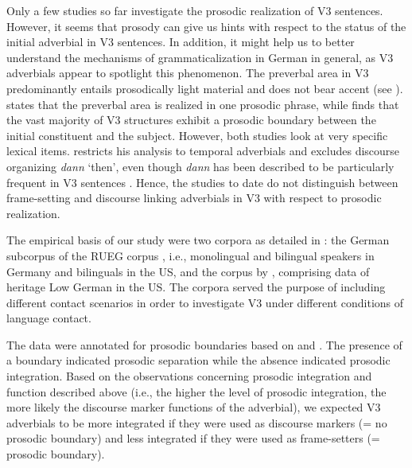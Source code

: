 \documentclass[output=paper,colorlinks,citecolor=brown]{langscibook}
\begin{document}
Only a few studies so far investigate the prosodic realization of V3 sentences. However, it seems that prosody can give us hints with respect to the status of the initial adverbial in V3 sentences. In addition, it might help us to better understand the mechanisms of grammaticalization in German in general, as V3 adverbials appear to spotlight this phenomenon. The preverbal area in V3 predominantly entails prosodically light material and does not bear accent (see \cite{Freywald_etal_2015, teVelde_2017}).  states that the preverbal area is realized in one prosodic phrase, while \citet{Breitbarth_2022} finds that the vast majority of V3 structures exhibit a prosodic boundary between the initial constituent and the subject. However, both studies look at very specific lexical items.  restricts his analysis to temporal adverbials and \citet{Breitbarth_2022} excludes discourse organizing \textit{dann} ‘then’, even though \textit{dann} has been described to be particularly frequent in V3 sentences \citep{Wiese_Müller_2018}. Hence, the studies to date do not distinguish between frame-setting and discourse linking adverbials in V3 with respect to prosodic realization.

The empirical basis of our study were two corpora as detailed in : the German subcorpus of the RUEG corpus \citep{Wiese_etal._2021}, i.e., monolingual and bilingual speakers in Germany and bilinguals in the US, and the corpus by \citet{Rocker_2022}, comprising data of heritage Low German in the US. The corpora served the purpose of including different contact scenarios in order to investigate V3 under different conditions of language contact.

The data were annotated for prosodic boundaries based on \citet{Himmelmann_Sandler_Strunk_Unterladstetter_2018} and \citet{Breitbarth_2022}. The presence of a boundary indicated prosodic separation while the absence indicated prosodic integration. Based on the observations concerning prosodic integration and function described above (i.e., the higher the level of prosodic integration, the more likely the discourse marker functions of the adverbial), we expected V3 adverbials to be more integrated if they were used as discourse markers (= no prosodic boundary) and less integrated if they were used as frame-setters (= prosodic boundary).
\end{document}

